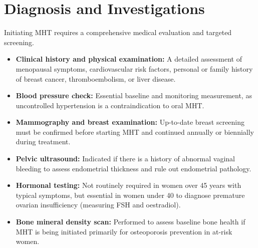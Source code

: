 \section*{Diagnosis and Investigations}
Initiating MHT requires a comprehensive medical evaluation and targeted screening.
\begin{itemize}
    \item \textbf{Clinical history and physical examination:} A detailed assessment of menopausal symptoms, cardiovascular risk factors, personal or family history of breast cancer, thromboembolism, or liver disease.
    \item \textbf{Blood pressure check:} Essential baseline and monitoring measurement, as uncontrolled hypertension is a contraindication to oral MHT.
    \item \textbf{Mammography and breast examination:} Up-to-date breast screening must be confirmed before starting MHT and continued annually or biennially during treatment.
    \item \textbf{Pelvic ultrasound:} Indicated if there is a history of abnormal vaginal bleeding to assess endometrial thickness and rule out endometrial pathology.
    \item \textbf{Hormonal testing:} Not routinely required in women over 45 years with typical symptoms, but essential in women under 40 to diagnose premature ovarian insufficiency (measuring FSH and oestradiol).
    \item \textbf{Bone mineral density scan:} Performed to assess baseline bone health if MHT is being initiated primarily for osteoporosis prevention in at-risk women.
\end{itemize}

